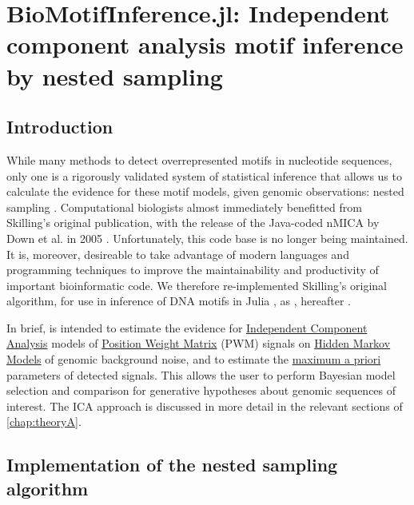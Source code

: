 \chapter{BioMotifInference.jl: Independent component analysis motif inference by nested sampling}
\label{chap:BMI}
\section{Introduction}
While many methods to detect overrepresented motifs in nucleotide sequences, only one is a rigorously validated system of statistical inference that allows us to calculate the evidence for these motif models, given genomic observations: nested sampling \cite{Skilling2006}. Computational biologists almost immediately benefitted from Skilling's original publication, with the release of the Java-coded nMICA by Down et al. in 2005 \cite{Down2005}. Unfortunately, this code base is no longer being maintained. It is, moreover, desireable to take advantage of modern languages and programming techniques to improve the maintainability and productivity of important bioinformatic code. We therefore re-implemented Skilling's original algorithm, for use in inference of DNA motifs in Julia \cite{Bezanson2015}, as , hereafter .

In brief,  is intended to estimate the evidence for \hyperref[ssec:ICA]{Independent Component Analysis} models of \hyperref[ssec:PWM]{Position Weight Matrix} (PWM) signals on \hyperref[ssec:HMM]{Hidden Markov Models} of genomic background noise, and to estimate the \hyperref[ssec:MLE]{maximum a priori} parameters of detected signals. This allows the user to perform Bayesian model selection and comparison for generative hypotheses about genomic sequences of interest. The ICA approach is discussed in more detail in the relevant sections of \autoref{chap:theoryA}.

\section{Implementation of the nested sampling algorithm}

